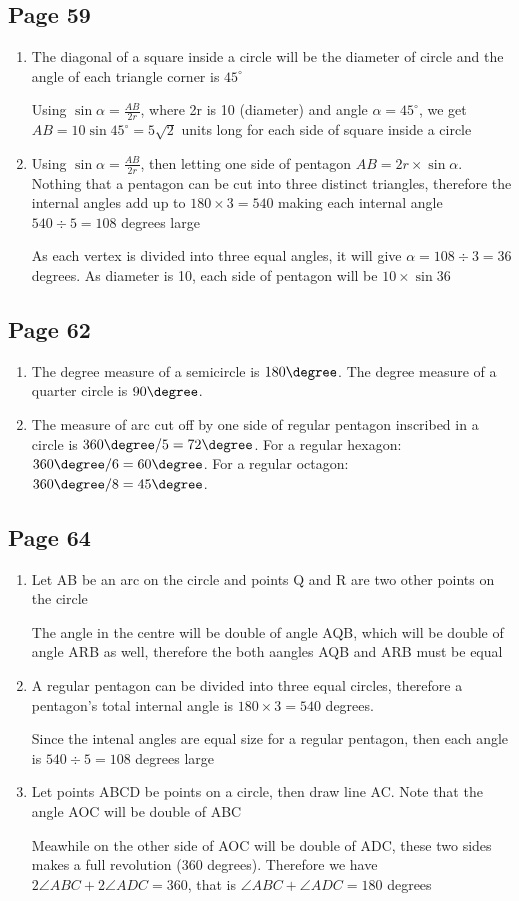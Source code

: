 \documentclass{article}
\newenvironment{solutions}[1]
{\subsection*{#1}
 \begin{enumerate}[leftmargin=1.5em]}
{\end{enumerate}}
\newcommand{\solution}{\item}
\begin{document}
\begin{solutions}{Page 59}
The chord AB would be $2\times 5 \times \sin 30^{\circ} = 5$ units long

\solution
The diagonal of a square inside a circle will be the diameter of circle and the angle of each triangle corner is $45^{\circ}$

Using $\sin \alpha = \frac{AB}{2r}$, where 2r is 10 (diameter) and angle $\alpha = 45^{\circ}$, we get $AB = 10\sin 45^{\circ} = 5\sqrt{2}$ units long for each side of square inside a circle
\solution
Using $\sin \alpha = \frac {AB}{2r}$, then letting one side of pentagon $AB = 2r \times \sin \alpha$. Nothing that a pentagon can be cut into three distinct triangles, therefore the internal angles add up to $180 \times 3 =540$ making each internal angle $540 \div 5 = 108$ degrees large

As each vertex is divided into three equal angles, it will give $\alpha = 108 \div 3 = 36$ degrees. As diameter is 10, each side of pentagon will be $10 \times \sin 36$ 
\end{solutions}

\begin{solutions}{Page 62}
\solution %
The degree measure of a semicircle is $180\degree$. The degree measure of a quarter circle is $90\degree$.
\solution %
The measure of arc cut off by one side of regular pentagon inscribed in a circle is $360\degree/5 = 72\degree$.
For a regular hexagon: $360\degree/6 = 60\degree$.
For a regular octagon: $360\degree/8 = 45\degree$.
\end{solutions}

\begin{solutions}{Page 64}
\solution
Let AB be an arc on the circle and points Q and R are two other points on the circle

The angle in the centre will be double of angle AQB, which will be double of angle ARB as well, therefore the both aangles AQB and ARB must be equal

\solution
A regular pentagon can be divided into three equal circles, therefore a pentagon's total internal angle is $180 \times 3 = 540$ degrees.

Since the intenal angles are equal size for a regular pentagon, then each angle is $540 \div 5 = 108$ degrees large
\solution
Let points ABCD be points on a circle, then draw line AC. Note that the angle AOC will be double of ABC

Meawhile on the other side of AOC will be double of ADC, these two sides makes a full revolution (360 degrees). Therefore we have $2\angle ABC + 2\angle ADC = 360$, that is $\angle ABC + \angle ADC = 180$ degrees

\end{solutions}
\end{document}
